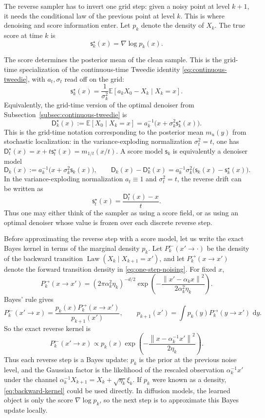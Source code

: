 \documentclass[10pt,a4paper]{amsart}
\numberwithin{equation}{section}
\DeclareMathOperator{\Law}{Law}
\newcommand{\E}{\mathbb{E}}
\newcommand{\dd}{\,\mathrm{d}}
\newcommand{\norm}[1]{\left\lVert #1 \right\rVert}
\newcommand{\sstar}{\mathsf{s}^{\star}}
\newcommand{\score}{\mathsf{s}}
\newcommand{\dstar}{\mathsf{D}^{\star}}
\newcommand{\denoiser}{\mathsf{D}}
\begin{document}
The reverse sampler has to invert one grid step: given a noisy point at level $k+1$, it needs the
conditional law of the previous point at level $k$.  This is where denoising and
score information enter.  Let $p_k$ denote the density of $X_k$.  The true score at time $k$ is
\[
    \sstar_k(x)=\nabla\log p_k(x).
\]

The score determines the posterior mean of the clean sample.  This is the
grid-time specialization of the continuous-time Tweedie identity
\eqref{eq:continuous-tweedie}, with $a_t,\sigma_t$ read off on the grid:
\begin{equation}\label{eq:tweedie}
    \sstar_k(x)
    =
    \frac{1}{\sigma_k^2}
    \E[a_kX_0-X_k\mid X_k=x].
\end{equation}
Equivalently, the grid-time version of the optimal denoiser from
Subsection~\ref{subsec:continuous-tweedie} is
\[
    \dstar_k(x)
    :=
    \E[X_0\mid X_k=x]
    =
    a_k^{-1}\bigl(x+\sigma_k^2\sstar_k(x)\bigr).
\]
This is the grid-time notation corresponding to the posterior mean $m_u(y)$
from stochastic localization: in the variance-exploding normalization
$\sigma_t^2=t$, one has $\dstar_t(x)=x+t\sstar_t(x)=m_{1/t}(x/t)$.
A score model $\score_k$ is equivalently a denoiser model
\[
    \denoiser_k(x)
    :=
    a_k^{-1}\bigl(x+\sigma_k^2\score_k(x)\bigr),
    \qquad
    \denoiser_k(x)-\dstar_k(x)
    =
    a_k^{-1}\sigma_k^2\bigl(\score_k(x)-\sstar_k(x)\bigr).
\]
In the variance-exploding normalization $a_t\equiv1$ and $\sigma_t^2=t$, the
reverse drift can be written as
\[
    \sstar_t(x)
    =
    \frac{\dstar_t(x)-x}{t}.
\]
Thus one may either think of the sampler as using a score field, or as using an
optimal denoiser whose value is frozen over each discrete reverse step.

Before approximating the reverse step with a score model, let us write the
exact Bayes kernel in terms of the marginal density $p_k$.  Let
$P_k^{\leftarrow}(x' \to \cdot)$ be the density of the backward transition
$\Law(X_k\mid X_{k+1}=x')$, and let $P_k^{\to}(x \to x')$ denote the forward
transition density in \eqref{eq:one-step-noising}.  For fixed $x$,
\[
    P_k^{\to}(x \to x')
    =
    (2\pi\alpha_k^2\eta_k)^{-d/2}
    \exp\left(
    -\frac{\norm{x'-\alpha_kx}^2}{2\alpha_k^2\eta_k}
    \right).
\]
Bayes' rule gives
\[
    P_k^{\leftarrow}(x' \to x)
    =
    \frac{p_k(x)P_k^{\to}(x \to x')}{p_{k+1}(x')},
    \qquad
    p_{k+1}(x')=\int p_k(y)P_k^{\to}(y \to x')\,\dd y.
\]
So the exact
reverse kernel is
\begin{equation}\label{eq:backward-kernel}
    P_k^{\leftarrow}(x' \to x)
    \propto
    p_k(x)
    \exp\!\left(
    -\frac{\norm{x-\alpha_k^{-1}x'}^2}{2\eta_k}
    \right).
\end{equation}
Thus each reverse step is a Bayes update: $p_k$ is the prior at the previous
noise level, and the Gaussian factor is the likelihood of the rescaled
observation $\alpha_k^{-1}x'$ under the channel
$\alpha_k^{-1}X_{k+1}=X_k+\sqrt{\eta_k}\xi_k$.  If $p_k$ were known as a
density, \eqref{eq:backward-kernel} could be used directly.  In diffusion
models, the learned object is only the score $\nabla\log p_k$, so the next step
is to approximate this Bayes update locally.
\end{document}

